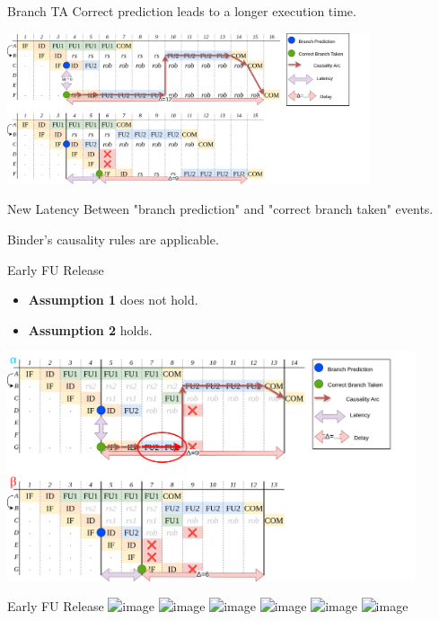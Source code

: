 \documentclass{beamer}
\begin{document}
\begin{frame}{Branch TA}
    Correct prediction leads to a longer execution time.

    \includegraphics[width=0.8\textwidth]{pic/simple-branch-ta-analyzed.png}

    \begin{block}{New Latency}
        Between "branch prediction" and "correct branch taken" events.
    \end{block}

    Binder's causality rules are applicable.
\end{frame}


\begin{frame}{Early FU Release}
    \begin{itemize}
        \item \textbf{Assumption 1} does not hold.
        \item \textbf{Assumption 2} holds.
    \end{itemize}
    \includegraphics[width=0.9\textwidth]{pic/nested-bp-ta.png}
\end{frame}


\begin{frame}{Early FU Release}
    \includegraphics<1>[scale=0.17]{pic/nested-bp-ta-1.png}
    \includegraphics<2>[scale=0.17]{pic/nested-bp-ta-2.png}
    \includegraphics<3>[scale=0.17]{pic/nested-bp-ta-3.png}
    \includegraphics<4>[scale=0.17]{pic/nested-bp-ta-4.png}
    \includegraphics<5>[scale=0.17]{pic/nested-bp-ta-5.png}
    \includegraphics<6>[scale=0.17]{pic/nested-bp-ta-6.png}
\end{frame}
\end{document}
